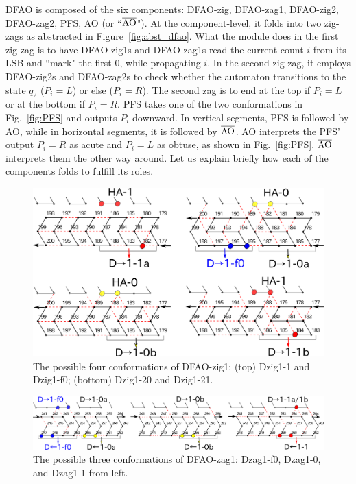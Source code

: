 DFAO is composed of the six components: DFAO-zig, DFAO-zag1, DFAO-zig2, DFAO-zag2, PFS, AO (or  ``$\overline{\rm AO}$").
At the component-level, it folds into two zig-zags as abstracted in Figure~\ref{fig:abst_dfao}.
What the module does in the first zig-zag is to have DFAO-zig1s and DFAO-zag1s read the current count $i$ from its LSB and ``mark" the first 0, while propagating $i$.
In the second zig-zag, it employs DFAO-zig2s and DFAO-zag2s to check whether the automaton transitions to the state $q_2$ ($P_i = L$) or else ($P_i = R$).
The second zag is to end at the top if $P_i = L$ or at the bottom if $P_i = R$.
PFS takes one of the two conformations in Fig.~\ref{fig:PFS} and outputs $P_i$ downward.
In vertical segments, PFS is followed by AO, while in horizontal segments, it is followed by $\overline{\rm AO}$.
AO interprets the PFS' output $P_i = R$ as acute and $P_i = L$ as obtuse, as shown in Fig.~\ref{fig:PFS}.
$\overline{\rm AO}$ interprets them the other way around.
Let us explain briefly how each of the components folds to fulfill its roles.

\begin{figure}[h]
\centering
\includegraphics[width=0.6\linewidth]{pic/DFAO-zig1.png}  
  \caption{The possible four conformations of DFAO-zig1: (top) Dzig1-1 and Dzig1-f0; (bottom) Dzig1-20 and Dzig1-21.}
  \label{fig:DFAO-zig1}
\end{figure} 


\begin{figure}[h]
  \includegraphics[width=\linewidth]{pic/DFAO-zag1.png}
  \caption{The possible three conformations of DFAO-zag1: Dzag1-f0, Dzag1-0, and Dzag1-1 from left.}
  \label{fig:DFAO-zag1}
\end{figure} 

